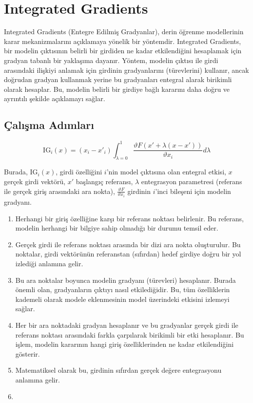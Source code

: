 \section{Integrated Gradients}

Integrated Gradients (Entegre Edilmiş Gradyanlar), derin öğrenme modellerinin karar mekanizmalarını açıklamaya yönelik bir yöntemdir. Integrated Gradients, bir modelin çıktısının belirli bir girdiden ne kadar etkilendiğini hesaplamak için gradyan tabanlı bir yaklaşıma dayanır. Yöntem, modelin çıktısı ile girdi arasındaki ilişkiyi anlamak için girdinin gradyanlarını (türevlerini) kullanır, ancak doğrudan gradyan kullanmak yerine bu gradyanları entegral alarak birikimli olarak hesaplar. Bu, modelin belirli bir girdiye bağlı kararını daha doğru ve ayrıntılı şekilde açıklamayı sağlar.

\subsection{Çalışma Adımları}

\[ \text{IG}_{i} (x) = (x_i - {x'}_i) \int_{\lambda=0}^{1} \frac{\vartheta F(x' + \lambda (x - x'))}{\vartheta x_i} d\lambda \]

Burada, $\text{IG}_{i} (x)$, girdi özelliğini $i$'nin model çıktısına olan entegral etkisi, $x$ gerçek girdi vektörü, $x'$ başlangıç referansı, $\lambda$ entegrasyon parametresi (referans ile gerçek giriş arasındaki ara nokta), $\frac{\vartheta F}{\vartheta x_i}$ girdinin $i$'inci bileşeni için modelin gradyanı.

\begin{enumerate}
    \item Herhangi bir giriş özelliğine karşı bir referans noktası belirlenir. Bu referans, modelin herhangi bir bilgiye sahip olmadığı bir durumu temsil eder.
    \item Gerçek girdi ile referans noktası arasında bir dizi ara nokta oluşturulur. Bu noktalar, girdi vektörünün referanstan (sıfırdan) hedef girdiye doğru bir yol izlediği anlamına gelir.
    \item Bu ara noktalar boyunca modelin gradyanı (türevleri) hesaplanır. Burada önemli olan, gradyanların çıktıyı nasıl etkilediğidir. Bu, tüm özelliklerin kademeli olarak modele eklenmesinin model üzerindeki etkisini izlemeyi sağlar.
    \item Her bir ara noktadaki gradyan hesaplanır ve bu gradyanlar gerçek girdi ile referans noktası arasındaki farkla çarpılarak birikimli bir etki hesaplanır. Bu işlem, modelin kararının hangi giriş özelliklerinden ne kadar etkilendiğini gösterir.
    \item Matematiksel olarak bu, girdinin sıfırdan gerçek değere entegrasyonu anlamına gelir.
    \item 
\end{enumerate}

\newpage